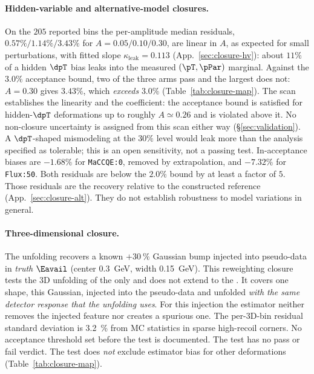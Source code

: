 \paragraph{Hidden-variable and alternative-model closures.} On the $205$ reported bins the per-amplitude median residuals, $0.57\% / 1.14\% / 3.43\%$ for $A = 0.05/0.10/0.30$, are linear in $A$, as expected for small perturbations, with fitted slope $\kappa_{\text{leak}} = \boxed{0.113}$ (App.~\ref{sec:closure-hv}): about $11\%$ of a hidden $\dpT$ bias leaks into the measured $(\pT,\pPar)$ marginal. Against the $3.0\%$ acceptance bound, two of the three arms pass and the largest does not: $A=0.30$ gives $3.43\%$, which \emph{exceeds} $3.0\%$ (Table~\ref{tab:closure-map}). The scan establishes the linearity and the coefficient: the acceptance bound is satisfied for hidden-$\dpT$ deformations up to roughly $A\simeq0.26$ and is violated above it. No non-closure uncertainty is assigned from this scan either way (\S\ref{sec:validation}). A $\dpT$-shaped mismodeling at the $30\%$ level would leak more than the analysis specified as tolerable; this is an open sensitivity, not a passing test. In-acceptance biases are $-1.68\%$ for \texttt{MaCCQE:0}, removed by extrapolation, and $-7.32\%$ for \texttt{Flux:50}. Both residuals are below the $2.0\%$ bound by at least a factor of $5$. Those residuals are the recovery relative to the constructed reference (App.~\ref{sec:closure-alt}). They do not establish robustness to model variations in general.

\paragraph{Three-dimensional closure.}
\label{sec:3d-closure}
The unfolding recovers a known $+\SI{30}{\percent}$ Gaussian bump injected into pseudo-data in \emph{truth} $\Eavail$ (center \SI{0.3}{GeV}, width \SI{0.15}{GeV}). This reweighting closure tests the 3D unfolding of the \estPurity{} only and does not extend to the \estMultiD{}. It covers one shape, this Gaussian, injected into the pseudo-data and unfolded \emph{with the same detector response that the unfolding uses}. For this injection the estimator neither removes the injected feature nor creates a spurious one. The per-3D-bin residual standard deviation is \SI{3.2}{\percent} from MC statistics in sparse high-recoil corners. No acceptance threshold set before the test is documented. The test has no pass or fail verdict. The test does \emph{not} exclude estimator bias for other deformations (Table~\ref{tab:closure-map}).
